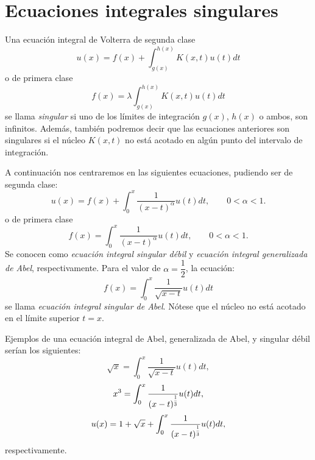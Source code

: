 \section{Ecuaciones integrales singulares}
\begin{definicion}
	Una ecuación integral de Volterra de segunda clase 
	\begin{equation}\label{}
		u(x) = f(x) + \int_{g(x)}^{h(x)} K(x,t)u(t)dt
	\end{equation}
	o de primera clase
	\begin{equation}\label{}
		f(x) = \lambda \int_{g(x)}^{h(x)} K(x,t)u(t)dt
	\end{equation}
	se llama \textit{singular} si uno de los límites de integración $g(x)$, $h(x)$ o ambos, son infinitos. Además, también podremos decir que las ecuaciones anteriores son singulares si el núcleo $K(x,t)$ no está acotado en algún punto del intervalo de integración.
\end{definicion}
A continuación nos centraremos en las siguientes ecuaciones, pudiendo ser de segunda clase:
\begin{equation}\label{}
	u(x) = f(x) + \int_0^x \dfrac{1}{(x-t)^\alpha}u(t)dt, \qquad 0 < \alpha < 1.
\end{equation}
o de primera clase
\begin{equation}\label{}
	f(x) = \int_0^x \dfrac{1}{(x-t)^\alpha}u(t)dt, \qquad 0 < \alpha < 1.
\end{equation}
Se conocen como \textit{ecuación integral singular débil} y \textit{ecuación integral generalizada de Abel}, respectivamente. Para el valor de $\alpha = \dfrac{1}{2}$, la ecuación:
\begin{equation}\label{}
	f(x) = \int_0^x \dfrac{1}{\sqrt{x-t}}u(t)dt
\end{equation}
se llama \textit{ecuación integral singular de Abel}. Nótese que el núcleo no está acotado en el límite superior $t = x$. 
\begin{ejemplo}
	Ejemplos de una ecuación integral de Abel, generalizada de Abel, y singular débil serían los siguientes:
	\begin{equation}\label{}
		\sqrt{x} = \int_0^x \dfrac{1}{\sqrt{x-t}}u(t)dt,
	\end{equation}
		\begin{equation}\label{}
		x^3 = \int_0^x \dfrac{1}{(x-t)^{\scaleto{\dfrac{1}{3}}{12pt}}}u(t)dt,
	\end{equation}
		\begin{equation}\label{}
		u(x) = 1 + \sqrt{x} + \int_0^x \dfrac{1}{(x-t)^{\scaleto{\dfrac{1}{3}}{12pt}}}u(t)dt,
	\end{equation}
	respectivamente.
\end{ejemplo}

\endinput